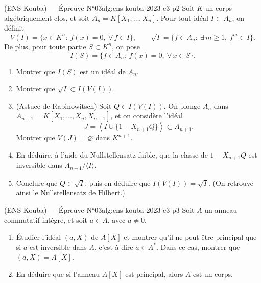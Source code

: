 \begin{problem}{(ENS Kouba) — Épreuve N°03}{alg:ens-kouba-2023-e3-p2}
Soit $K$ un corps algébriquement clos, et soit $A_n=K[X_1,\dots,X_n]$. Pour tout
idéal $I\subset A_n$, on définit
$$
V(I)=\{x\in K^n:\ f(x)=0,\ \forall\,f\in I\},
\qquad
\sqrt I=\{f\in A_n:\ \exists\,m\ge1,\ f^m\in I\}.
$$
De plus, pour toute partie $S\subset K^n$, on pose
$$
I(S)=\{f\in A_n:\ f(x)=0,\ \forall\,x\in S\}.
$$
\begin{enumerate}
\item Montrer que $I(S)$ est un idéal de $A_n$.
\item Montrer que $\sqrt I\subset I(V(I))$.
\item (Astuce de Rabinowitsch) Soit $Q\in I(V(I))$. On plonge $A_n$ dans
      $A_{n+1}=K[X_1,\dots,X_n,X_{n+1}]$, et on considère l'idéal
      $$
      J=\left\langle I\cup\{1-X_{n+1}Q\}\right\rangle\subset A_{n+1}.
      $$
      Montrer que $V(J)=\varnothing$ dans $K^{n+1}$.
\item En déduire, à l'aide du Nullstellensatz faible, que la classe de
      $1-X_{n+1}Q$ est inversible dans $A_{n+1}/\langle I\rangle$.
\item Conclure que $Q\in\sqrt I$, puis en déduire que $I(V(I))=\sqrt I$.
      (On retrouve ainsi le Nullstellensatz de Hilbert.)
\end{enumerate}

\end{problem}

\newpage

\begin{problem}{(ENS Kouba) — Épreuve N°03}{alg:ens-kouba-2023-e3-p3}
Soit $A$ un anneau commutatif intègre, et soit $a\in A$, avec $a\neq0$.
\begin{enumerate}
\item Étudier l'idéal $(a,X)$ de $A[X]$ et montrer qu'il ne peut être principal que
      si $a$ est inversible dans $A$, c'est-à-dire $a\in A^*$. Dans ce cas, montrer
      que $(a,X)=A[X]$.
\item En déduire que si l'anneau $A[X]$ est principal, alors $A$ est un corps.
\end{enumerate}

\end{problem}

\newpage

